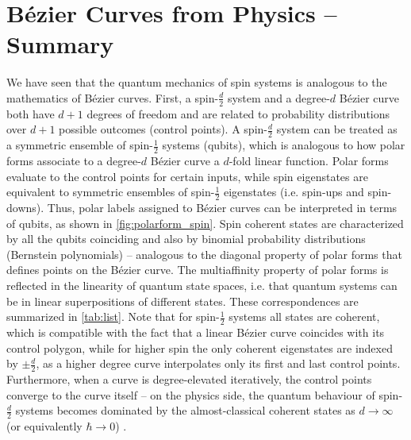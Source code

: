 \documentclass[12pt,final,3p]{elsarticle}
\begin{document}
\section{B\'{e}zier Curves from Physics -- Summary}\label{sec:summary}
We have seen that the quantum mechanics of spin systems is analogous to the mathematics of B\'{e}zier curves. First, a spin-$\frac{d}{2}$ system and a degree-$d$ B\'{e}zier curve both have $d+1$ degrees of freedom and are related to probability distributions over $d+1$ possible outcomes (control points). A spin-$\frac{d}{2}$ system can be treated as a symmetric ensemble of spin-$\frac{1}{2}$ systems (qubits), which is analogous to how polar forms associate to a degree-$d$ B\'{e}zier curve a $d$-fold linear function. Polar forms evaluate to the control points for certain inputs, while spin eigenstates are equivalent to symmetric ensembles of spin-$\frac{1}{2}$ eigenstates (i.e. spin-ups and spin-downs). Thus, polar labels assigned to B\'{e}zier curves can be interpreted in terms of qubits, as shown in \autoref{fig:polarform_spin}. Spin coherent states are characterized by all the qubits coinciding and also by binomial probability distributions (Bernstein polynomials) -- analogous to the diagonal property of polar forms that defines points on the B\'{e}zier curve. The multiaffinity property of polar forms is reflected in the linearity of quantum state spaces, i.e. that quantum systems can be in linear superpositions of different states. These correspondences are summarized in \autoref{tab:list}. Note that for spin-$\frac{1}{2}$ systems all states are coherent, which is compatible with the fact that a linear B\'{e}zier curve coincides with its control polygon, while for higher spin the only coherent eigenstates are indexed by $\pm\frac{d}{2}$, as a higher degree curve interpolates only its first and last control points. Furthermore, when a curve is degree-elevated iteratively, the control points converge to the curve itself -- on the physics side,  the quantum behaviour of spin-$\frac{d}{2}$ systems becomes dominated by the almost-classical coherent states as $d \rightarrow \infty$ (or equivalently $\hbar \rightarrow 0$) \cite[Ch. 7.5]{gazeau2009coherent}.
\end{document}
